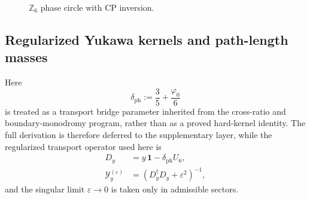 \documentclass[11pt,a4paper]{article}
\theoremstyle{definition}
\theoremstyle{remark}
\newcommand{\phiz}{\varphi_0}
\begin{document}
\begin{figure}[t]
\centering
{}
\caption{$\mathbb Z_6$ phase circle with CP inversion.}
\label{fig:z6-circle}
\end{figure}

\subsection{Regularized Yukawa kernels and path-length masses}

Here
\begin{equation}
\label{eq:transport-bridge-offset}
\delta_{\mathrm{ph}}:=\frac35+\frac{\phiz}{6}
\end{equation}
is treated as a transport bridge parameter inherited from the cross-ratio and boundary-monodromy program, rather than as a proved hard-kernel identity. The full derivation is therefore deferred to the supplementary layer, while the regularized transport operator used here is
\begin{equation}
\label{eq:yukawa-kernel}
\begin{aligned}
D_y&=y\,\mathbf 1-\delta_{\mathrm{ph}}U_6,\\
\mathcal Y_y^{(\varepsilon)}&=(D_y^\dagger D_y+\varepsilon^2)^{-1},
\end{aligned}
\end{equation}
and the singular limit $\varepsilon\to0$ is taken only in admissible sectors.
\end{document}
